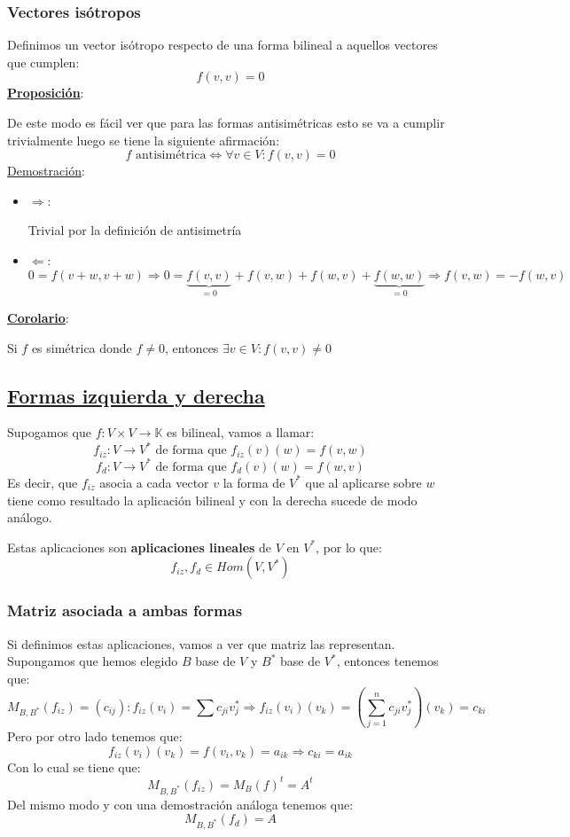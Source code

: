\documentclass[10pt,a4paper,openright]{book}
\begin{document}
\subsubsection*{Vectores isótropos}
Definimos un vector isótropo respecto de una forma bilineal a aquellos vectores que cumplen:
$$f(v,v)=0$$
\underline{\textbf{Proposición}}:

De este modo es fácil ver que para las formas antisimétricas esto se va a cumplir trivialmente luego se tiene la siguiente afirmación:
$$f \mbox{ antisimétrica} \Leftrightarrow \forall v\in V: f(v,v)=0$$
\underline{Demostración}:
\begin{itemize}
\item $\Rightarrow$:

Trivial por la definición de antisimetría

\item $\Leftarrow$:
$$0= f(v+w, v+w)\Rightarrow 0= \underbrace{f(v,v)}_{=0}+ f(v,w)+ f(w,v)+ \underbrace{f(w,w)}_{=0}\Rightarrow f(v,w)= - f(w,v)$$
\end{itemize}

\underline{\textbf{Corolario}}:

Si $f$ es simétrica donde $f\neq 0$, entonces $\exists v\in V: f(v,v)\neq 0$


\subsection*{\underline{Formas izquierda y derecha}}
Supogamos que $f:V\times V \rightarrow \mathbb K$ es bilineal, vamos a llamar:
$$f_{iz}: V\rightarrow V^*\mbox{ de forma que } f_{iz}(v)(w) = f(v,w)$$
$$f_{d}: V\rightarrow V^*\mbox{ de forma que } f_{d}(v)(w) = f(w,v)$$
Es decir, que $f_{iz}$ asocia a cada vector $v$ la forma de $V^*$ que al aplicarse sobre $w$ tiene como resultado la aplicación bilineal y con la derecha sucede de modo análogo.

Estas aplicaciones son \textbf{aplicaciones lineales} de $V$ en $V^*$, por lo que:
$$f_{iz},f_{d}\in Hom(V,V^*)$$

\subsubsection*{Matriz asociada a ambas formas}
Si definimos estas aplicaciones, vamos a ver que matriz las representan. Supongamos que hemos elegido $B$ base de $V$ y $B^*$ base de $V^*$, entonces tenemos que:
$$M_{B,B^*}(f_{iz})= (c_{ij}): f_{iz}(v_i)=\sum c_{ji}v_j^* \Rightarrow f_{iz}(v_i)(v_k)= \left(\sum_{j=1}^{n} c_{ji}v_j^*\right)(v_k) = c_{ki}$$
Pero por otro lado tenemos que:
$$f_{iz}(v_i)(v_k)=f(v_i,v_k) = a_{ik}\Rightarrow c_{ki} = a_{ik}$$
Con lo cual se tiene que:
$$M_{B,B^*}(f_{iz}) = M_B(f)^t = A^t$$
Del mismo modo y con una demostración análoga tenemos que:
$$M_{B,B^*}(f_d) = A$$
\end{document}
